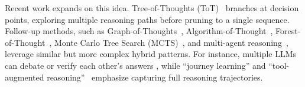 Recent work expands on this idea.
Tree-of-Thoughts (ToT)~\citep{yao2023tree} branches at decision points, exploring multiple reasoning paths before pruning to a single sequence. Follow-up methods, such as Graph-of-Thoughts~\citep{Besta2024graph}, Algorithm-of-Thought~\citep{sel2024algorithm}, Forest-of-Thought~\citep{bi2024forest}, Monte Carlo Tree Search (MCTS)~\citep{lin2025leveragingconstrainedmontecarlo}, and multi-agent reasoning~\cite{wang2025mixtureofagents,chen2024routerdcquerybasedrouterdual}, leverage similar but more complex hybrid patterns. For instance, multiple LLMs can debate or verify each other’s answers \citep{liang2024encouraging, schaul2024boundlesssocraticlearninglanguage}, while ``journey learning'' and ``tool-augmented reasoning''~\citep{li2025startselftaughtreasonertools} emphasize capturing full reasoning trajectories.

